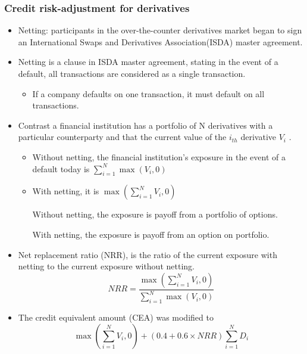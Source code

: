 \subsubsection{Credit risk-adjustment for derivatives}
\begin{itemize}
\item Netting: participants in the over-the-counter derivatives market began to sign an International Swaps and Derivatives Association(ISDA) master agreement.
\item Netting is a clause in ISDA master agreement, stating in the event of a default, all transactions are considered as a single transaction.
    \begin{itemize}
    \item If a company defaults on one transaction, it must default on all transactions.
    \end{itemize}

\item Contrast a financial institution has a portfolio of N derivatives with a particular counterparty and that the current value of the $i_{th}$ derivative $V_i$ .
    \begin{itemize}
    \item Without netting, the financial institution's exposure in the event of a default today is \(\sum_{i=1}^{N} \max(V_i, 0)\)
    \item With netting, it is \( \max\left(\sum_{i=1}^{N} V_i, 0\right) \)
    
    Without netting, the exposure is payoff from a portfolio of options.

    With netting, the exposure is payoff from an option on  portfolio.
    \end{itemize}
\item Net replacement ratio (NRR), is the ratio of the current exposure with netting to the current exposure without netting.
    \begin{equation}
    NRR = \frac{\max\left(\sum_{i=1}^{N} V_i, 0\right)}{\sum_{i=1}^{N} \max(V_i, 0)}
    \end{equation}
\item The credit equivalent amount (CEA) was modified to
    \begin{equation}
    \max\left(\sum_{i=1}^{N} V_i, 0\right) + (0.4 + 0.6 \times NRR) \sum_{i=1}^{N} D_i
    \end{equation}


\end{itemize}
